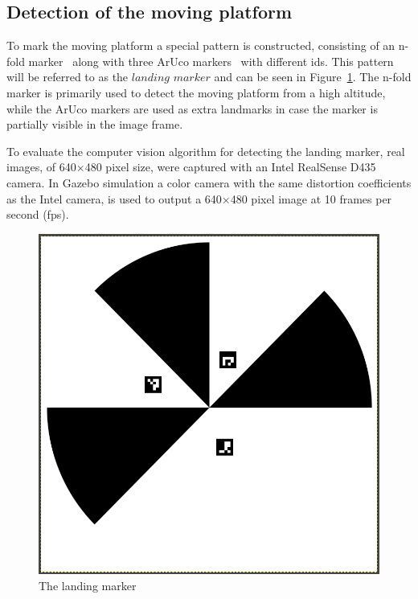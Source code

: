 \documentclass[conference]{IEEEtran}
\begin{document}
\subsection{Detection of the moving platform}
\label{sec:Detection}

To mark the moving platform a special pattern is constructed,
consisting of an n-fold marker~\cite{NfoldMarker} along with three
ArUco markers~\cite{ArUco_marker} with different ids. This pattern
will be referred to as the $landing$ $marker$ and can be seen in
Figure~\ref{fig:LandingMarker}. The n-fold marker is primarily used to
detect the moving platform from a high altitude, while the ArUco
markers are used as extra landmarks in case the marker is partially
visible in the image frame.

To evaluate the computer vision algorithm for detecting the landing
marker, real images, of 640$\times$480 pixel size, were captured with
an Intel RealSense D435 camera. In Gazebo simulation a color camera
with the same distortion coefficients as the Intel camera, is used to
output a 640$\times$480 pixel image at 10 frames per second (fps).

\begin{figure}
\centering
\includegraphics[scale=0.15]{n-fold-for-landing.png}
\caption{The landing marker}
\label{fig:LandingMarker}
\end{figure}
\end{document}

